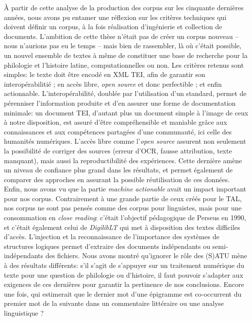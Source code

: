 À partir de cette analyse de la production des corpus sur les cinquante dernières années, nous avons pu entamer une réflexion sur les critères techniques qui doivent définir un corpus, à la fois réalisation d'ingénierie et collection de documents. L'ambition de cette thèse n'était pas de créer un corpus nouveau -- nous n'aurions pas eu le temps -- mais bien de rassembler, là où c'était possible, un nouvel ensemble de textes à même de constituer une base de recherche pour la philologie et l'histoire latine, computationnelles ou non. Les critères retenus sont simples: le texte doit être encodé en XML TEI, afin de garantir son interopérabilitié ; en accès libre, \textit{open source} et donc perfectible ; et enfin actionnable. L'interopérabilité, doublée par l'utilisation d'un standard, permet de pérenniser l'information produite et d'en assurer une forme de documentation minimale: un document TEI, d'autant plus un document simple à l'image de ceux à notre disposition, est assuré d'être compréhensible et maniable grâce aux connaissances et aux compétences partagées d'une communauté, ici celle des humanités numériques. L'accès libre comme l'\textit{open source} assurent non seulement la possibilité de corriger des sources (erreur d'OCR, fausse attribution, texte manquant), mais aussi la reproductibilité des expériences. Cette dernière amène un niveau de confiance plus grand dans les résultats, et permet également de comparer des approches en assurant la possible réutilisation de ces données. Enfin, nous avons vu que la partie \textit{machine actionable} avait un impact important pour nos corpus. Contrairement à une grande partie de ceux créés pour le TAL, nos corpus ne sont pas pensés comme des corpus pour linguistes, mais pour une consommation en \textit{close reading}: c'était l'objectif pédagogique de Perseus en 1990, et c'était également celui de \textit{DigilibLT} qui met à disposition des textes difficiles d'accès. L'injection et la reconnaissance de l'importance des systèmes de structures logiques permet d'extraire des documents indépendants ou semi-indépendants des fichiers. Nous avons montré qu'ignorer le rôle des (S)ATU mène à des résultats différents: s'il s'agit de s'appuyer sur un traitement numérique du texte pour une question de philologie ou d'histoire, il faut pouvoir s'adapter aux exigences de ces dernières pour garantir la pertinence de nos conclusions. Encore une fois, qui estimerait que le dernier mot d'une épigramme est co-occurrent du premier mot de la suivante dans un commentaire littéraire ou une analyse linguistique ?

